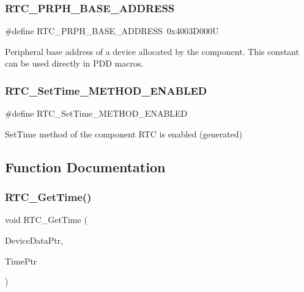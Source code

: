 \subsubsection{\texorpdfstring{R\+T\+C\+\_\+\+P\+R\+P\+H\+\_\+\+B\+A\+S\+E\+\_\+\+A\+D\+D\+R\+E\+SS}{RTC\_PRPH\_BASE\_ADDRESS}}
{\footnotesize\ttfamily \#define R\+T\+C\+\_\+\+P\+R\+P\+H\+\_\+\+B\+A\+S\+E\+\_\+\+A\+D\+D\+R\+E\+SS~0x4003\+D000U}

Peripheral base address of a device allocated by the component. This constant can be used directly in P\+DD macros. \mbox{\label{group___r_t_c__module_ga89cd8bb411583901f1c1a0e76ca5d9de}} 
\subsubsection{\texorpdfstring{R\+T\+C\+\_\+\+Set\+Time\+\_\+\+M\+E\+T\+H\+O\+D\+\_\+\+E\+N\+A\+B\+L\+ED}{RTC\_SetTime\_METHOD\_ENABLED}}
{\footnotesize\ttfamily \#define R\+T\+C\+\_\+\+Set\+Time\+\_\+\+M\+E\+T\+H\+O\+D\+\_\+\+E\+N\+A\+B\+L\+ED}

Set\+Time method of the component R\+TC is enabled (generated) 

\subsection{Function Documentation}
\mbox{\label{group___r_t_c__module_gae7aa19d663f150815eba0a2738ef22fb}} 
\subsubsection{\texorpdfstring{R\+T\+C\+\_\+\+Get\+Time()}{RTC\_GetTime()}}
{\footnotesize\ttfamily void R\+T\+C\+\_\+\+Get\+Time (\begin{DoxyParamCaption}\item[{\hyperlink{group___p_e___types__module_gac5cf1362f1f0e3a2ce71b1bf2276d091}{L\+D\+D\+\_\+\+T\+Device\+Data} $\ast$}]{Device\+Data\+Ptr,  }\item[{\hyperlink{struct_l_d_d___r_t_c___t_time}{L\+D\+D\+\_\+\+R\+T\+C\+\_\+\+T\+Time} $\ast$}]{Time\+Ptr }\end{DoxyParamCaption})}



